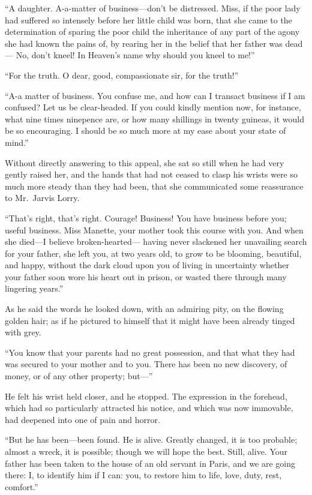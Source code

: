 ``A daughter.  A-a-matter of business---don't be distressed.  Miss,
if the poor lady had suffered so intensely before her little child
was born, that she came to the determination of sparing the poor
child the inheritance of any part of the agony she had known the
pains of, by rearing her in the belief that her father was dead---%
No, don't kneel!  In Heaven's name why should you kneel to me!''

``For the truth. O dear, good, compassionate sir, for the truth!''

``A-a matter of business.  You confuse me, and how can I transact
business if I am confused?  Let us be clear-headed.  If you could
kindly mention now, for instance, what nine times ninepence are,
or how many shillings in twenty guineas, it would be so encouraging.
I should be so much more at my ease about your state of mind.''

Without directly answering to this appeal, she sat so still when
he had very gently raised her, and the hands that had not ceased
to clasp his wrists were so much more steady than they had been,
that she communicated some reassurance to Mr.\ Jarvis Lorry.

``That's right, that's right.  Courage!  Business!  You have business
before you; useful business.  Miss Manette, your mother took this
course with you.  And when she died---I believe broken-hearted---%
having never slackened her unavailing search for your father,
she left you, at two years old, to grow to be blooming, beautiful,
and happy, without the dark cloud upon you of living in uncertainty
whether your father soon wore his heart out in prison, or wasted
there through many lingering years.''

As he said the words he looked down, with an admiring pity, on the
flowing golden hair; as if he pictured to himself that it might have
been already tinged with grey.

``You know that your parents had no great possession, and that what
they had was secured to your mother and to you.  There has been no
new discovery, of money, or of any other property; but---''

He felt his wrist held closer, and he stopped.  The expression in the
forehead, which had so particularly attracted his notice, and which
was now immovable, had deepened into one of pain and horror.

``But he has been---been found.  He is alive.  Greatly changed, it is
too probable; almost a wreck, it is possible; though we will hope the
best.  Still, alive.  Your father has been taken to the house of an
old servant in Paris, and we are going there:  I, to identify him if
I can:  you, to restore him to life, love, duty, rest, comfort.''


